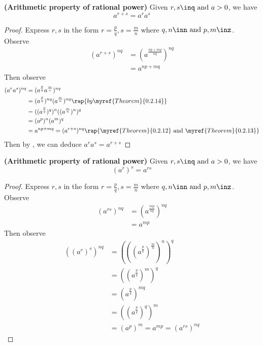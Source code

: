 \documentclass{report}
\begin{document}
\begin{theorem}
\label{1.3.12}
 \textbf{(Arithmetic property of rational power)} Given $r,s\inq\text{ and }a>0$, we have
\begin{equation*}
a^{r+s}=a^ra^s
\end{equation*}
\end{theorem}
\begin{proof}
Express $r,s$ in the form $r=\frac{p}{q},s=\frac{m}{n}$ where $q,n\inn\text{ and }p,m \inz$. Observe
\begin{align*}
  (a^{r+s})^{nq}&=(a^{\frac{np+mq}{nq}})^{nq}\\
  &=a^{np+mq} 
\end{align*}
Then observe
\begin{align*}
  (a^ra^s)^{nq}&= (a^{\frac{p}{q}}a^{\frac{m}{n}})^{nq} \\
  &= (a^{\frac{p}{q}})^{nq}(a^{\frac{m}{n}})^{nq}\rap{by \myref{Theorem}{0.2.14}}\\
  &=((a^{\frac{p}{q}})^q)^n((a^{\frac{m}{n}})^n)^q\\
&=(a^p)^n(a^m)^q\\
&= a^{np+mq}=(a^{r+s})^{nq}\rap{\myref{Theorem}{0.2.12}\text{ and }\myref{Theorem}{0.2.13}} 
\end{align*}
Then by , we can deduce $a^ra^s=a^{r+s}$ 
\end{proof}
\begin{theorem}
\label{1.3.13}
\textbf{(Arithmetic property of rational power)} Given $r,s\inq\text{ and }a>0$, we have
\begin{equation*}
  (a^r)^s=a^{rs}
\end{equation*}
\end{theorem}
\begin{proof}
Express $r,s$ in the form $r=\frac{p}{q},s=\frac{m}{n}$ where $q,n\inn\text{ and }p,m \inz$. Observe
\begin{align*}
  (a^{rs})^{nq}&=(a^{\frac{mp}{nq}})^{nq}\\
  &= a^{mp}
\end{align*}
Then observe
\begin{align*}
  ((a^r)^s)^{nq}&=(((a^{\frac{p}{q}})^{\frac{m}{n}})^n)^q\\
  &=((a^{\frac{p}{q}})^m)^q\\
 &=(a^{\frac{p}{q}})^{mq}\\
  &=((a^{\frac{p}{q}})^q)^m \\
  &=(a^p)^m=a^{mp}=(a^{rs})^{nq}  
\end{align*}
\end{proof}
\end{document}
